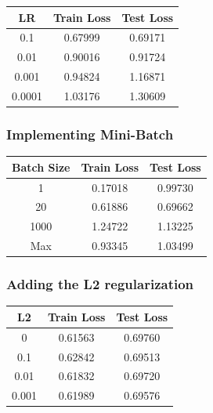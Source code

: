 \documentclass[
	letterpaper, %
	10pt, %
]{class}
\begin{document}
\begin{center}
    \begin{tabular}{ |c|c|c| }
        \hline
        LR     & Train Loss & Test Loss \\
        \hline
        0.1    & 0.67999    & 0.69171   \\
        0.01   & 0.90016    & 0.91724   \\
        0.001  & 0.94824    & 1.16871   \\
        0.0001 & 1.03176    & 1.30609   \\
        \hline
    \end{tabular}
\end{center}

\subsubsection{Implementing Mini-Batch}

\begin{center}
    \begin{tabular}{ |c|c|c| }
        \hline
        Batch Size & Train Loss & Test Loss \\
        \hline
        1          & 0.17018    & 0.99730   \\
        20         & 0.61886    & 0.69662   \\
        1000       & 1.24722    & 1.13225   \\
        Max        & 0.93345    & 1.03499   \\
        \hline
    \end{tabular}
\end{center}

\subsubsection{Adding the L2 regularization}

\begin{center}
    \begin{tabular}{ |c|c|c| }
        \hline
        L2    & Train Loss & Test Loss \\
        \hline
        0     & 0.61563    & 0.69760   \\
        0.1   & 0.62842    & 0.69513   \\
        0.01  & 0.61832    & 0.69720   \\
        0.001 & 0.61989    & 0.69576   \\
        \hline
    \end{tabular}
\end{center}
\end{document}
